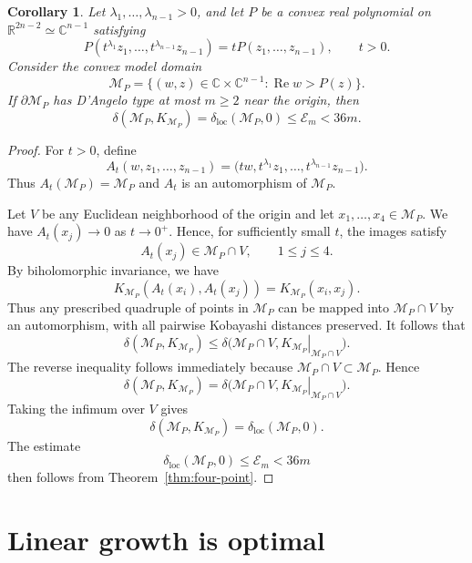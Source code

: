 \documentclass[11pt]{article}
\newtheorem{corollary}[theorem]{Corollary}
\theoremstyle{definition}
\newcommand{\C}{\mathbb{C}}
\newcommand{\R}{\mathbb{R}}
\renewcommand{\Re}{\operatorname{Re}}
\begin{document}
\begin{corollary}\label{cor:homogeneous-tangent-model}
Let \(\lambda_1,\ldots,\lambda_{n-1}>0\), and let \(P\) be a convex
real polynomial on \(\R^{2n-2}\simeq\C^{n-1}\) satisfying
\[
P(t^{\lambda_1}z_1,\ldots,t^{\lambda_{n-1}}z_{n-1})
=
tP(z_1,\ldots,z_{n-1}),
\qquad t>0.
\]
Consider the convex model domain
\[
\mathcal M_P
=
\bigl\{
(w,z)\in\C\times\C^{n-1}:
\Re w>P(z)
\bigr\}.
\]
If \(\partial\mathcal M_P\) has D'Angelo type at most \(m\ge2\)
near the origin, then
\[
\delta(\mathcal M_P,K_{\mathcal M_P})
=
\delta_{\mathrm{loc}}(\mathcal M_P,0)
\le
\mathcal E_m
<
36m.
\]
\end{corollary}

\begin{proof}
For \(t>0\), define
\[
A_t(w,z_1,\ldots,z_{n-1})
=
\bigl(
tw,t^{\lambda_1}z_1,\ldots,t^{\lambda_{n-1}}z_{n-1}
\bigr).
\]
Thus
\(A_t(\mathcal M_P)=\mathcal M_P\) and  \(A_t\) is an automorphism of
\(\mathcal M_P\).

Let \(V\) be any Euclidean neighborhood of the origin and let
\(x_1,\ldots,x_4\in\mathcal M_P\).  We have
\(A_t(x_j)\to0\) as \(t\to0^+\).  Hence, for sufficiently small
\(t\), the images satisfy
\[
A_t(x_j)\in\mathcal M_P\cap V,
\qquad 1\le j\le4.
\]
By biholomorphic invariance, we have
\[
K_{\mathcal M_P}(A_t(x_i),A_t(x_j))
=
K_{\mathcal M_P}(x_i,x_j).
\]
Thus any prescribed quadruple of points in \(\mathcal M_P\) can be
mapped into \(\mathcal M_P\cap V\) by an automorphism, with all pairwise
Kobayashi distances preserved.  It follows that
\[
\delta(\mathcal M_P,K_{\mathcal M_P})
\le
\delta\bigl(
\mathcal M_P\cap V,
\left.K_{\mathcal M_P}\right|_{\mathcal M_P\cap V}
\bigr).
\]
The reverse inequality follows immediately because
\(\mathcal M_P\cap V\subset\mathcal M_P\).  Hence
\[
\delta(\mathcal M_P,K_{\mathcal M_P})
=
\delta\bigl(
\mathcal M_P\cap V,
\left.K_{\mathcal M_P}\right|_{\mathcal M_P\cap V}
\bigr).
\]
Taking the infimum over \(V\) gives
\[
\delta(\mathcal M_P,K_{\mathcal M_P})
=
\delta_{\mathrm{loc}}(\mathcal M_P,0).
\]
The estimate
\[
\delta_{\mathrm{loc}}(\mathcal M_P,0)
\le
\mathcal E_m
<
36m
\]
then follows from Theorem~\ref{thm:four-point}.
\end{proof}








\section{Linear growth is optimal}\label{sec:lower-bound}
\end{document}
